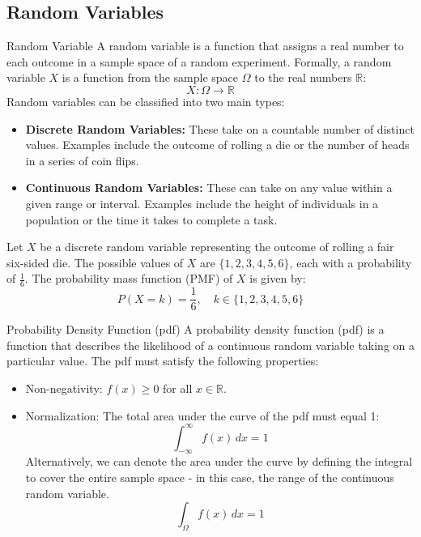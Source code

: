 \documentclass[openany]{book}
\begin{document}
\subsection{Random Variables}
\begin{mydefinition}{Random Variable}
    A random variable is a function that assigns a real number to each outcome in a sample space of a random experiment. Formally, a random variable $X$ is a function from the sample space $\Omega$ to the real numbers $\mathbb{R}$:
    $$X: \Omega \to \mathbb{R}$$
    Random variables can be classified into two main types:
    \begin{itemize}
        \item \textbf{Discrete Random Variables:} These take on a countable number of distinct values. Examples include the outcome of rolling a die or the number of heads in a series of coin flips.
        \item \textbf{Continuous Random Variables:} These can take on any value within a given range or interval. Examples include the height of individuals in a population or the time it takes to complete a task.
    \end{itemize}
\end{mydefinition}
\begin{example}
    Let $X$ be a discrete random variable representing the outcome of rolling a fair six-sided die. The possible values of $X$ are $\{1, 2, 3, 4, 5, 6\}$, each with a probability of $\frac{1}{6}$. The probability mass function (PMF) of $X$ is given by:
    $$P(X = k) = \frac{1}{6}, \quad k \in \{1, 2, 3, 4, 5, 6\}$$
\end{example}
\begin{mydefinition}{Probability Density Function (pdf)}
    A probability density function (pdf) is a function that describes the likelihood of a continuous random variable taking on a particular value. The pdf must satisfy the following properties:
    \begin{itemize}
        \item Non-negativity: $f(x) \geq 0$ for all $x \in \mathbb{R}$.
        \item Normalization: The total area under the curve of the pdf must equal 1:
        $$\int_{-\infty}^{\infty} f(x) \, dx = 1$$
        Alternatively, we can denote the area under the curve by defining the integral to cover the entire sample space - in this case, the range of the continuous random variable.
        $$\int_{\Omega} f(x) \, dx = 1$$
    \end{itemize}
\end{mydefinition}
\end{document}
